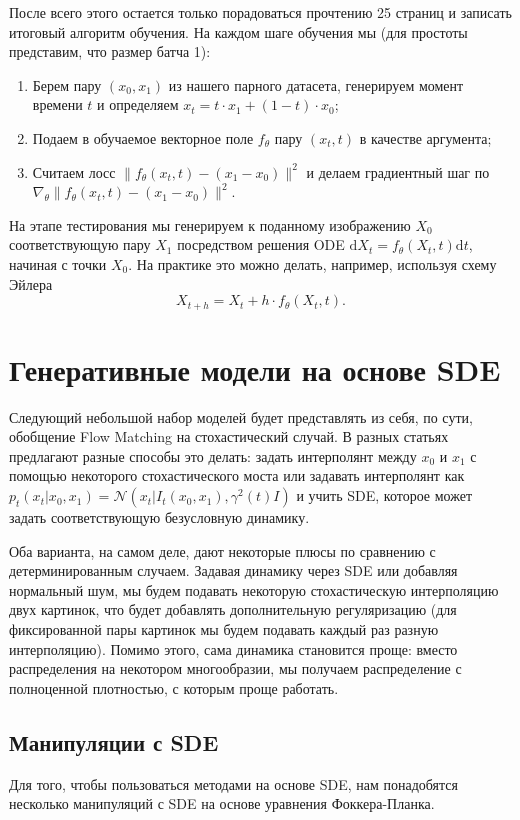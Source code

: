 \documentclass[12pt]{article}
\theoremstyle{definition}
\begin{document}
После всего этого остается только порадоваться прочтению 25 страниц и записать итоговый алгоритм обучения. На каждом шаге обучения мы (для простоты представим, что размер батча 1):
\begin{enumerate}
    \item Берем пару $(x_0, x_1)$ из нашего парного датасета, генерируем момент времени $t$ и определяем $x_t = t \cdot x_1 + (1 - t) \cdot x_0$;
    \item Подаем в обучаемое векторное поле $f_\theta$ пару $(x_t, t)$ в качестве аргумента;
    \item Считаем лосс $\|f_\theta(x_t, t) - (x_1 - x_0) \|^2$ и делаем градиентный шаг по $\nabla_\theta\|f_\theta(x_t, t) - (x_1 - x_0) \|^2$.
\end{enumerate}

На этапе тестирования мы генерируем к поданному изображению $X_0$ соответствующую пару $X_1$ посредством решения ODE $\mathrm{d} X_t = f_\theta(X_t, t) \mathrm{d} t$, начиная с точки $X_0$. На практике это можно делать, например, используя схему Эйлера
\[
    X_{t + h} = X_t + h \cdot f_\theta(X_t, t).
\]

\section{Генеративные модели на основе SDE}
Следующий небольшой набор моделей будет представлять из себя, по сути, обобщение Flow Matching на стохастический случай. В разных статьях предлагают разные способы это делать: задать интерполянт между $x_0$ и $x_1$ с помощью некоторого стохастического моста или задавать интерполянт как $p_t(x_t | x_0, x_1) = \mathcal{N}(x_t | I_t(x_0, x_1), \gamma^2(t) I)$ и учить SDE, которое может задать соответствующую безусловную динамику.

Оба варианта, на самом деле, дают некоторые плюсы по сравнению с детерминированным случаем. Задавая динамику через SDE или добавляя нормальный шум, мы будем подавать некоторую стохастическую интерполяцию двух картинок, что будет добавлять дополнительную регуляризацию (для фиксированной пары картинок мы будем подавать каждый раз разную интерполяцию). Помимо этого, сама динамика становится проще: вместо распределения на некотором многообразии, мы получаем распределение с полноценной плотностью, с которым проще работать. 

\subsection{Манипуляции с SDE}
Для того, чтобы пользоваться методами на основе SDE, нам понадобятся несколько манипуляций с SDE на основе уравнения Фоккера-Планка.
\end{document}
